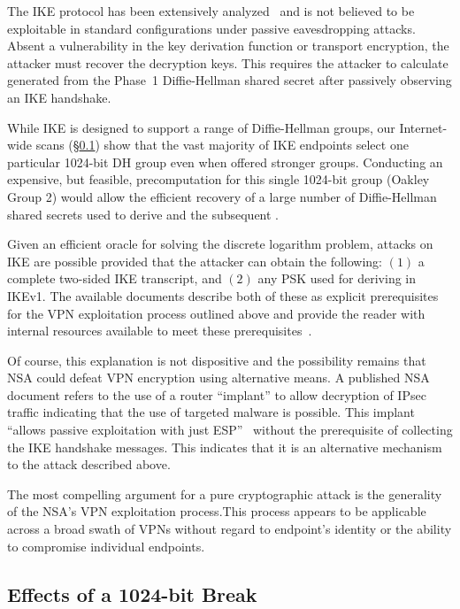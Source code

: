 The IKE protocol has been extensively analyzed~\cite{ck02,meadows99}
and is not believed to be exploitable in standard configurations under
passive eavesdropping attacks.  Absent a vulnerability
in the key derivation function or transport encryption, the attacker must recover the decryption keys. This requires
the attacker to calculate \skeyid{} generated from the Phase~1 Diffie-Hellman shared secret after passively
observing an IKE handshake.

While IKE is designed to support a range of Diffie-Hellman groups, our
Internet-wide scans (\S\ref{sec:1024effects}) show that the vast
majority of IKE endpoints select one particular 1024-bit DH group even when offered stronger groups. Conducting an expensive, but feasible, precomputation for this single 1024-bit group (Oakley Group 2) would allow the efficient recovery of a large number of Diffie-Hellman shared secrets used to derive \skeyid{} and the subsequent \keymat.

Given an efficient oracle for solving the discrete logarithm problem,
attacks on IKE are possible provided that the attacker can obtain the
following: $(1)$ a complete two-sided IKE transcript, and
$(2)$ any PSK used for deriving {\skeyid} in IKEv1. The available documents describe both of these as explicit prerequisites for the VPN exploitation process outlined above and provide the reader with internal resources available to meet these prerequisites~\cite{media-35515}.

Of course, this explanation is not dispositive and the possibility
remains that NSA could defeat VPN encryption using alternative means.  A
published NSA document refers to the use of a router ``implant'' to allow decryption of IPsec traffic
indicating that the use of targeted malware is possible. This implant ``allows passive exploitation with just ESP''~\cite{media-35515} without the prerequisite of collecting the IKE handshake messages. This indicates that it is an alternative mechanism to the attack described above.

The most compelling argument
for a pure cryptographic attack is the generality of the NSA's VPN exploitation process.This process appears to be applicable across a broad swath of VPNs without regard to endpoint's identity or the ability to compromise individual endpoints.


\subsection{Effects of a 1024-bit Break}
\label{sec:1024effects}

